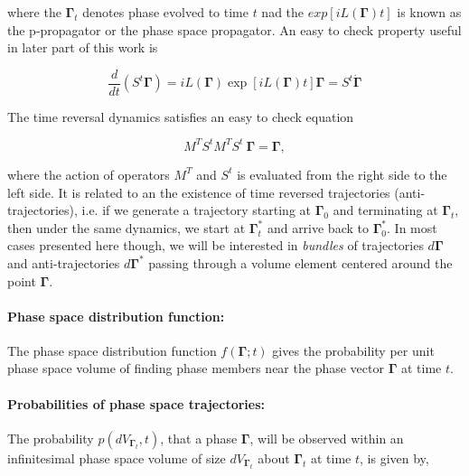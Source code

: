 \documentclass[a4paper,12pt]{article}
\begin{document}
where the $\bm{\Gamma}_t$ denotes phase evolved to time $t$ nad the $ exp[iL(\bm{\Gamma})t] $ is known as the p-propagator or the phase space propagator.
An easy to check property useful in later part of this work is

\begin{equation}
\label{PhaseTimeDer}
  \frac{d}{dt}(S^t \bm{\Gamma})=iL(\bm{\Gamma})\exp[iL(\bm{\Gamma})t]\bm{\Gamma}=S^t \dot{\bm{\Gamma}}
\end{equation}



The time reversal dynamics satisfies an easy to check equation

\begin{equation}
  M^T S^t M^T S^t\ \bm{\Gamma} = \bm{\Gamma},
\end{equation}

where the action of operators $M^T$ and $S^t$ is evaluated from the right side to the left side. It is related to an the existence of time reversed trajectories (anti-trajectories), i.e. if we generate a trajectory starting at $\bm{\Gamma}_0$ and terminating at $\bm{\Gamma}_t$, then under the same dynamics, we start at $\bm{\Gamma}_t^*$ and arrive back to $\bm{\Gamma}_0^*$.
In most cases presented here though, we will be interested in \textit{bundles} of trajectories $d\bm{\Gamma}$ and anti-trajectories $d\bm{\Gamma}^*$ passing through a volume element centered around the point $\bm{\Gamma}$.

\paragraph{Phase space distribution function:}

The phase space distribution function $f(\bm{\Gamma};t)$ gives the probability per unit phase space volume of finding phase members near the phase vector $\bm{\Gamma}$ at time $t$.

\paragraph{Probabilities of phase space trajectories: }
The probability $p(d V_{\bm{\Gamma}_t},t)$, that a phase $\bm{\Gamma}$, will be observed within an infinitesimal phase space volume of size $d V_{\bm{\Gamma}_t}$ about $\bm{\Gamma}_t$ at time $t$, is given by,
\end{document}
